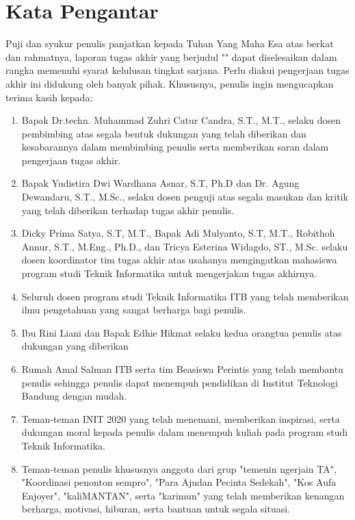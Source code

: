 \chapter*{Kata Pengantar}

Puji dan syukur penulis panjatkan kepada Tuhan Yang Maha Esa atas berkat dan rahmatnya, laporan tugas akhir yang berjudul "\thetitle" dapat diselesaikan dalam rangka memenuhi syarat kelulusan tingkat sarjana. Perlu diakui pengerjaan tugas akhir ini didukung oleh banyak pihak. Khususnya, penulis ingin mengucapkan terima kasih kepada:

\begin{enumerate}
  \item Bapak Dr.techn. Muhammad Zuhri Catur Candra, S.T., M.T., selaku dosen pembimbing atas segala bentuk dukungan yang telah diberikan dan kesabarannya dalam membimbing penulis serta memberikan saran dalam pengerjaan tugas akhir.
  \item Bapak Yudistira Dwi Wardhana Asnar, S.T, Ph.D dan Dr. Agung Dewandaru, S.T., M.Sc., selaku dosen penguji atas segala masukan dan kritik yang telah diberikan terhadap tugas akhir penulis.
  \item Dicky Prima Satya, S.T, M.T., Bapak Adi Mulyanto, S.T, M.T., Robithoh Annur, S.T., M.Eng., Ph.D., dan Tricya Esterina Widagdo, ST., M.Sc. selaku dosen koordinator tim tugas akhir atas usahanya mengingatkan mahasiswa program studi Teknik Informatika untuk mengerjakan tugas akhirnya.
  \item Seluruh dosen program studi Teknik Informatika ITB yang telah memberikan ilmu pengetahuan yang sangat berharga bagi penulis.
  \item Ibu Rini Liani dan Bapak Edhie Hikmat selaku kedua orangtua penulis atas dukungan yang diberikan
  \item Rumah Amal Salman ITB serta tim Beasiswa Perintis yang telah membantu penulis sehingga penulis dapat menempuh pendidikan di Institut Teknologi Bandung dengan mudah.
  \item Teman-teman INIT 2020 yang telah menemani, memberikan inspirasi, serta dukungan moral kepada penulis dalam menempuh kuliah pada program studi Teknik Informatika.
  \item Teman-teman penulis khususnya anggota dari grup "temenin ngerjain TA", "Koordinasi penonton sempro", "Para Ajudan Pecinta Sedekah", "Kos Aufa Enjoyer", "kaliMANTAN", serta "karimun" yang telah memberikan kenangan berharga, motivasi, hiburan, serta bantuan untuk segala situasi.

\end{enumerate}
